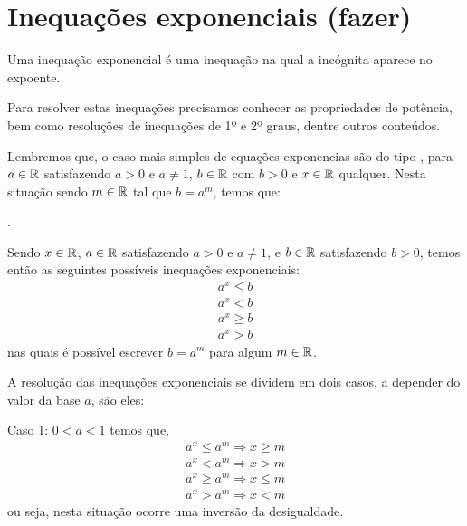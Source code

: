  \section{Inequações exponenciais (fazer)}
 
 \vskip0.3cm
 \colorbox{azul}{
 \begin{minipage}{0.9\linewidth}
 \begin{center}
  Uma inequação exponencial é uma inequação na qual a incógnita aparece no expoente.
 \end{center}
 \end{minipage}}
 \vskip0.3cm 
 
 Para resolver estas inequações precisamos conhecer as propriedades de potência, bem como resoluções de inequações de 1º e 2º graus, dentre outros conteúdos. 
 
  Lembremos que, o caso mais simples de equações exponencias são do tipo
 ,
 para $a \in \mathbb{R}$ satisfazendo $a > 0$ e $a \neq 1$, $b \in \mathbb{R}$ com $b > 0$ e $x \in \mathbb{R}$ qualquer. Nesta situação sendo $m \in \mathbb{R}$ tal que $b= a^{m}$, temos que:

 .
 
 \vskip0.3cm
 \colorbox{azul}{
 \begin{minipage}{0.9\linewidth}
 \begin{center}
  Sendo $x \in \mathbb{R}$, $a \in \mathbb{R}$ satisfazendo $a > 0$ e $a \neq 1$, e $b \in \mathbb{R}$ satisfazendo $b > 0$, temos então as seguintes possíveis inequações exponenciais:
 \begin{eqnarray*}
 a^x \leq b \\
 a^x < b \\
 a^x \geq b \\
 a^x > b 
 \end{eqnarray*} 
 nas quais é possível escrever $b=a^m$ para algum $m \in \mathbb{R}$.
 \end{center}
 \end{minipage}}
 \vskip0.3cm 
 
 A resolução das inequações exponenciais se dividem em dois casos, a depender do valor da base $a$, são eles:
 
 Caso 1: $0 < a < 1$ temos que,
  \begin{eqnarray*}
 a^x \leq a^m \Rightarrow x \geq m\\
 a^x < a^m \Rightarrow x > m \\
 a^x \geq a^m \Rightarrow x \leq m\\
 a^x > a^m \Rightarrow x < m
 \end{eqnarray*}
 ou seja, nesta situação ocorre uma inversão da desigualdade.
 
